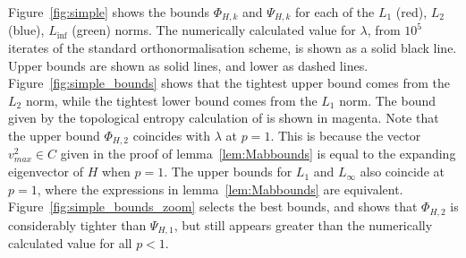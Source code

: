 \documentclass{iopart}
\begin{document}
Figure~\ref{fig:simple} shows the bounds $\Phi_{H,k}$ and 
$\Psi_{H,k}$ for each of the $L_1$ (red), $L_2$ (blue), $L_{\inf}$ (green) norms. The numerically calculated value for $\lambda$, from $10^5$ iterates of the standard orthonormalisation scheme, is shown as a solid black line. Upper bounds are shown as solid lines, and lower as dashed lines. 
Figure~\ref{fig:simple_bounds} shows that the tightest upper bound comes from the $L_2$ norm, while the tightest lower bound comes from the $L_1$ norm. The bound given by the topological entropy calculation of \cite{DAlessandro1999} is shown in magenta. Note that the upper bound $\Phi_{H,2}$ coincides with $\lambda$ at $p=1$. This is because the vector $v^2_{max} \in C$ given in the proof of lemma~\ref{lem:Mabbounds} is equal to the expanding eigenvector of $H$ when $p=1$. The upper bounds for $L_1$ and $L_{\infty}$ also coincide at $p=1$, where the expressions in lemma~\ref{lem:Mabbounds} are equivalent. Figure~\ref{fig:simple_bounds_zoom} selects the best bounds, and shows that $\Phi_{H,2}$ is considerably tighter than $\Psi_{H,1}$, but still appears greater than the numerically calculated value for all $p<1$. 
\end{document}
